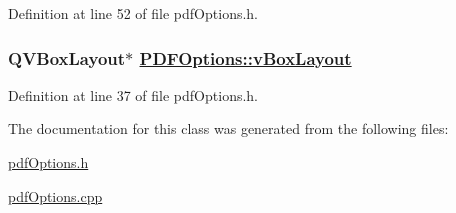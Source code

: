 Definition at line 52 of file pdf\-Options.h.\hypertarget{classPDFOptions_r2}{
\subsubsection[vBoxLayout]{\setlength{\rightskip}{0pt plus 5cm}QVBox\-Layout$\ast$ \hyperlink{classPDFOptions_r2}{PDFOptions::v\-Box\-Layout}}}
\label{classPDFOptions_r2}


Definition at line 37 of file pdf\-Options.h.

The documentation for this class was generated from the following files:\begin{CompactItemize}
\item 
\hyperlink{pdfOptions_8h}{pdf\-Options.h}\item 
\hyperlink{pdfOptions_8cpp}{pdf\-Options.cpp}\end{CompactItemize}
